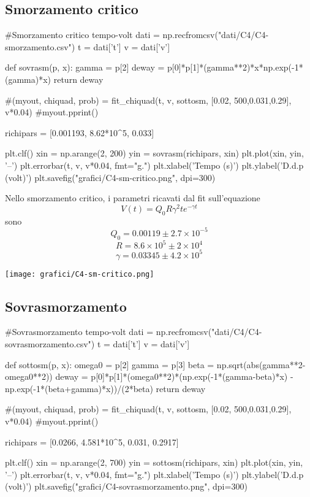 \begin{center}
\end{center}
\subsection{Smorzamento critico}

\begin{sagesilent}

#Smorzamento critico tempo-volt
dati = np.recfromcsv("dati/C4/C4-smorzamento.csv")
t = dati['t']
v = dati['v']

def sovrasm(p, x):
  gamma = p[2]
  deway = p[0]*p[1]*(gamma**2)*x*np.exp(-1*(gamma)*x)
  return deway
  
#(myout, chiquad, prob) = fit_chiquad(t, v, sottosm, [0.02, 500,0.031,0.29], v*0.04)
#myout.pprint()

richipars = [0.001193, 8.62*10^5, 0.033]

plt.clf()
xin = np.arange(2, 200)
yin = sovrasm(richipars, xin)
plt.plot(xin, yin, '--')
plt.errorbar(t, v, v*0.04, fmt="g.")
plt.xlabel('Tempo (s)')
plt.ylabel('D.d.p (volt)')
plt.savefig("grafici/C4-sm-critico.png", dpi=300)
\end{sagesilent}
Nello smorzamento critico, i parametri ricavati dal fit sull'equazione
$$V(t) = Q_0R\gamma^2te^{-\gamma t}$$
sono
$$Q_0 = 0.00119\pm2.7\times10^{-5}$$
$$R=8.6\times10^5\pm2\times10^4$$
$$\gamma = 0.03345\pm4.2\times10^5$$

\begin{center}
\texttt{[image: grafici/C4-sm-critico.png]}
\end{center}

\subsection{Sovrasmorzamento}
\begin{sagesilent}
#Sovrasmorzamento tempo-volt
dati = np.recfromcsv("dati/C4/C4-sovrasmorzamento.csv")
t = dati['t']
v = dati['v']

def sottosm(p, x):
  omega0 = p[2]
  gamma = p[3]
  beta = np.sqrt(abs(gamma**2-omega0**2))
  deway = p[0]*p[1]*(omega0**2)*(np.exp(-1*(gamma-beta)*x) - np.exp(-1*(beta+gamma)*x))/(2*beta)
  return deway
  
#(myout, chiquad, prob) = fit_chiquad(t, v, sottosm, [0.02, 500,0.031,0.29], v*0.04)
#myout.pprint()

richipars = [0.0266, 4.581*10^5, 0.031, 0.2917]

plt.clf()
xin = np.arange(2, 700)
yin = sottosm(richipars, xin)
plt.plot(xin, yin, '--')
plt.errorbar(t, v, v*0.04, fmt="g.")
plt.xlabel('Tempo (s)')
plt.ylabel('D.d.p (volt)')
plt.savefig("grafici/C4-sovrasmorzamento.png", dpi=300)
\end{sagesilent}

